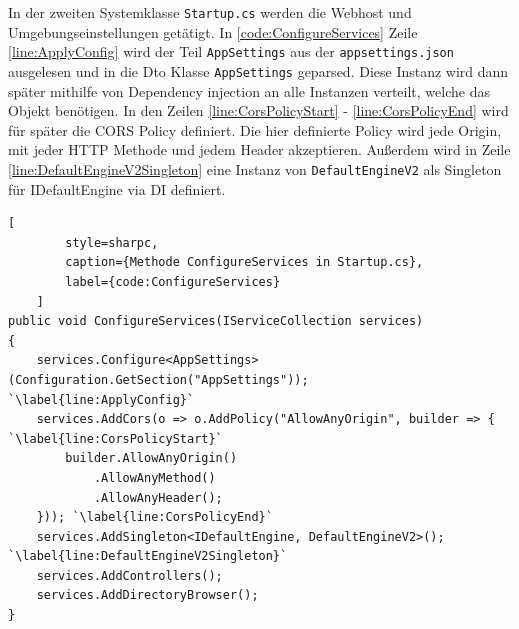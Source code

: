 In der zweiten Systemklasse \texttt{Startup.cs} werden die
Webhost und Umgebungseinstellungen getätigt.
In \lstlistingname\space \ref{code:ConfigureServices} Zeile \ref{line:ApplyConfig}
wird der Teil \texttt{AppSettings} aus der
\texttt{appsettings.json} ausgelesen und in die Dto Klasse
\texttt{AppSettings} geparsed. Diese Instanz wird dann später
mithilfe von Dependency injection an alle Instanzen verteilt,
welche das Objekt benötigen. In den Zeilen \ref{line:CorsPolicyStart}
- \ref{line:CorsPolicyEnd} wird für später die CORS Policy definiert.
Die hier definierte Policy wird jede Origin, mit jeder HTTP Methode
und jedem Header akzeptieren. Außerdem wird in Zeile
\ref{line:DefaultEngineV2Singleton} eine Instanz von \texttt{DefaultEngineV2}
als Singleton für IDefaultEngine via DI definiert.

\begin{codeblock}
	\begin{lstlisting}[
		style=sharpc,
		caption={Methode ConfigureServices in Startup.cs},
		label={code:ConfigureServices}
	]
public void ConfigureServices(IServiceCollection services)
{
	services.Configure<AppSettings>(Configuration.GetSection("AppSettings"));	`\label{line:ApplyConfig}`
	services.AddCors(o => o.AddPolicy("AllowAnyOrigin", builder => { `\label{line:CorsPolicyStart}`
		builder.AllowAnyOrigin()
			.AllowAnyMethod()
			.AllowAnyHeader();
	})); `\label{line:CorsPolicyEnd}`
	services.AddSingleton<IDefaultEngine, DefaultEngineV2>(); `\label{line:DefaultEngineV2Singleton}`
	services.AddControllers();
	services.AddDirectoryBrowser();
}
	\end{lstlisting}
\end{codeblock}

